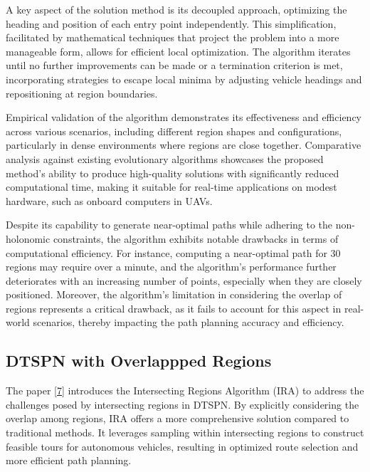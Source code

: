 \vspace{3mm}

A key aspect of the solution method is its decoupled approach, optimizing the heading and position of each entry point independently. This simplification, facilitated by mathematical techniques that project the problem into a more manageable form, allows for efficient local optimization. The algorithm iterates until no further improvements can be made or a termination criterion is met, incorporating strategies to escape local minima by adjusting vehicle headings and repositioning at region boundaries.

\vspace{3mm}

Empirical validation of the algorithm demonstrates its effectiveness and efficiency across various scenarios, including different region shapes and configurations, particularly in dense environments where regions are close together. Comparative analysis against existing evolutionary algorithms showcases the proposed method's ability to produce high-quality solutions with significantly reduced computational time, making it suitable for real-time applications on modest hardware, such as onboard computers in UAVs.

\vspace{3mm}

Despite its capability to generate near-optimal paths while adhering to the non-holonomic constraints, the algorithm exhibits notable drawbacks in terms of computational efficiency. For instance, computing a near-optimal path for 30 regions may require over a minute, and the algorithm's performance further deteriorates with an increasing number of points, especially when they are closely positioned. Moreover, the algorithm's limitation in considering the overlap of regions represents a critical drawback, as it fails to account for this aspect in real-world scenarios, thereby impacting the path planning accuracy and efficiency.




\subsection{DTSPN with Overlappped Regions}



The paper \hyperlink{cite.overlap}{[7]} introduces the Intersecting Regions Algorithm (IRA) to address the challenges posed by intersecting regions in DTSPN. By explicitly considering the overlap among regions, IRA offers a more comprehensive solution compared to traditional methods. It leverages sampling within intersecting regions to construct feasible tours for autonomous vehicles, resulting in optimized route selection and more efficient path planning.

